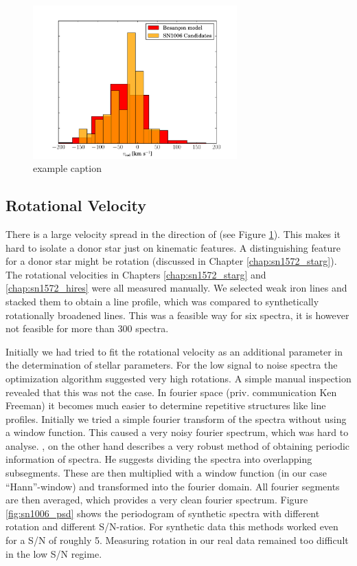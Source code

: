 \begin{figure}[htbp] %
   \centering
   \includegraphics[width=0.7\textwidth]{chapter_sn1006/plots/sn1006_vrad_besancon.pdf} 
   \caption{example caption}
   \label{fig:sn1006_vrad_comp}
\end{figure}


\subsection{Rotational Velocity}
\label{sec:sn1006_rotvel}
There is a large velocity spread in the direction of  (see Figure \ref{fig:sn1006_vrad_comp}). This makes it hard to isolate a donor star just on kinematic features. A distinguishing feature for a donor star might be rotation (discussed in  Chapter \ref{chap:sn1572_starg}). The rotational velocities in Chapters \ref{chap:sn1572_starg} and \ref{chap:sn1572_hires} were all measured manually. We selected weak iron lines and stacked them to obtain a line profile, which was compared to synthetically rotationally broadened lines. This was a feasible way for six spectra, it is however not feasible for more than 300 spectra. 

Initially we had tried to fit the rotational velocity as an additional parameter in the determination of stellar parameters. For the low signal to noise spectra the optimization algorithm suggested very high rotations. A simple manual inspection revealed that this was not the case. In fourier space (priv. communication Ken Freeman) it becomes much easier to determine repetitive  structures like line profiles. Initially we tried a simple fourier transform of the spectra without using a window function. This caused a very noisy fourier spectrum, which was hard to analyse. \cite{citeulike:8297810}, on the other hand describes a very robust method of obtaining periodic information of spectra.  He suggests dividing the spectra into overlapping subsegments. These are then multiplied with a window function (in our case ``Hann''-window) and transformed into the fourier domain. All fourier segments are then averaged, which provides a very clean fourier spectrum. Figure \ref{fig:sn1006_psd} shows the periodogram of synthetic spectra with different rotation and different S/N-ratios. For synthetic data this methods worked even for a S/N of roughly 5. Measuring rotation in our real data remained too difficult in the low S/N regime. 

